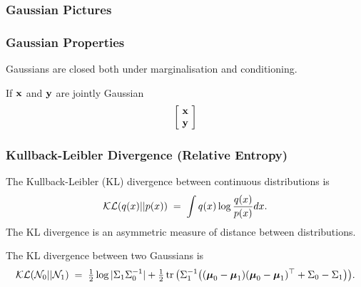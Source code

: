 \begin{frame}
\frametitle{Gaussian Pictures}

\end{frame}

\begin{frame}
\frametitle{Gaussian Properties}

Gaussians are closed both under marginalisation and conditioning.

If ${\bf x}$ and ${\bf y}$ are jointly Gaussian
\[
\left[\!\begin{array}{c}{\bf x}\\{\bf y}\end{array}\!\right] 
\]

\end{frame}

\begin{frame}
\frametitle{Kullback-Leibler Divergence (Relative Entropy)}

The Kullback-Leibler (KL) divergence between continuous distributions is
%
\[
{\cal KL}(q(x)||p(x))\;=\;\int q(x)\log\frac{q(x)}{p(x)}dx.
\]
%
The KL divergence is an asymmetric measure of distance between distributions.

The KL divergence between two Gaussians is
\[
{\cal KL}({\cal N}_0||{\cal N}_1)\;=\;\tfrac{1}{2}\log|\Sigma_1\Sigma_0^{-1}|
+\tfrac{1}{2}\operatorname{tr}\big(\Sigma_1^{-1}
\big((\boldsymbol{\mu}_0-\boldsymbol{\mu}_1)
(\boldsymbol{\mu}_0-\boldsymbol{\mu}_1)^\top + \Sigma_0 - \Sigma_1\big)\big).
\]

\end{frame}

